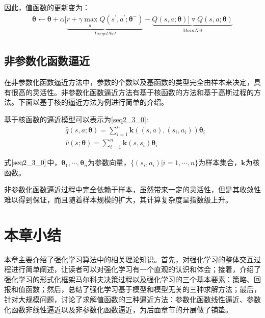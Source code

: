 因此，值函数的更新变为：
\begin{equation}
\begin{aligned}
\bm{\theta} \leftarrow \bm{\theta} + \alpha[\underbrace{r+\gamma \max_{a^{'}}Q(s^{'},a^{'};\bm{\theta}^{-})}_{TargetNet}-\underbrace{Q(s,a;\bm{\theta})]\triangledown Q(s,a;\bm{\theta})}_{MainNet}
\end{aligned}
\end{equation}

\subsection{非参数化函数逼近}
在非参数化函数逼近方法中，参数的个数以及基函数的类型完全由样本来决定，具有很高的灵活性。非参数化函数逼近方法有基于核函数的方法和基于高斯过程的方法。下面以基于核的逼近方法为例进行简单的介绍。

基于核函数的逼近模型可以表示为\eqref{seq2_3_0}:
\begin{equation}\label{seq2_3_0}
\begin{aligned}
&\hat{q}(s,a;\bm{\theta})=\sum^{n}_{i=1}\bm{k}((s,a),(s_{i},a_{i}))\bm{\theta}_{i}\\
&\hat{v}(s;\bm{\theta})=\sum^{n}_{i=1}\bm{k}(s,s_{i})\bm{\theta}_{i}
\end{aligned}
\end{equation}

式$\eqref{seq2_3_0}$中，$\bm{\theta}_{1},\cdots,\bm{\theta}_{n}$为参数向量，$\{(s_{i},a_{i})|i=1,\cdots,n\}$为样本集合，$\bm{k}$为核函数。

非参数化函数逼近过程中完全依赖于样本，虽然带来一定的灵活性，但是其收敛性难以得到保证，而且随着样本规模的扩大，其计算复杂度呈指数级上升。

\section{本章小结}
 本章主要介绍了强化学习算法中的相关理论知识。首先，对强化学习的整体交互过程进行简单阐述，让读者可以对强化学习有一个直观的认识和体会；接着，介绍了强化学习的形式化框架马尔科夫决策过程以及强化学习的三个基本要素：策略、回报和值函数；然后，总结了强化学习基于模型和模型无关的三种求解方法；最后，针对大规模问题，讨论了求解值函数的三种逼近方法：参数化函数线性逼近、参数化函数非线性逼近以及非参数化函数逼近，为后面章节的开展做了铺垫。
 \cleardoublepage
